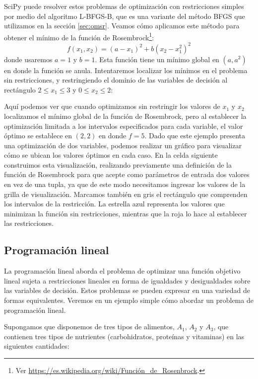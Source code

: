 SciPy puede resolver estos problemas de optimización con restricciones simples por medio del algoritmo L-BFGS-B, que es una variante del método BFGS que utilizamos en la sección \ref{sec:omsr}. Veamos cómo aplicamos este método para obtener el mínimo de la función de Rosembrock\footnote{Ver \url{https://es.wikipedia.org/wiki/Función_de_Rosenbrock}.}:
\[ f(x_1, x_2) = (a - x_1)^2 + b (x_2 - x_1^2)^2 \]
donde usaremos $a = 1$ y $b = 1$. Esta función tiene un mínimo global en $(a, a^2)$ en donde la función se anula. Intentaremos localizar los mínimos en el problema sin restricciones, y restringiendo el dominio de las variables de decisión al rectángulo $2 \leq x_1 \leq 3$ y $0 \leq x_2 \leq 2$:


Aquí podemos ver que cuando optimizamos sin restringir los valores de $x_1$ y $x_2$ localizamos el mínimo global de la función de Rosembrock, pero al establecer la optimización limitada a los intervalos especificados para cada variable, el valor óptimo se establece en $(2, 2)$ en donde $f = 5$. Dado que este ejemplo presenta una optimización de dos variables, podemos realizar un gráfico para visualizar cómo se ubican los valores óptimos en cada caso. En la celda siguiente construimos esta visualización, realizando previamente una definición de la función de Rosembrock para que acepte como parámetros de entrada dos valores en vez de una tupla, ya que de este modo necesitamos ingresar los valores de la grilla de visualización. Marcamos también en gris el rectángulo que comprenden los intervalos de la restricción. La estrella azul representa los valores que minimizan la función sin restricciones, mientras que la roja lo hace al establecer las restricciones.


\subsection{Programación lineal} \label{subsec:proglin}
La programación lineal aborda el problema de optimizar una función objetivo lineal sujeta a restricciones lineales en forma de igualdades y desigualdades sobre las variables de decisión. Estos problemas se pueden expresar en una variedad de formas equivalentes. Veremos en un ejemplo simple cómo abordar un problema de programación lineal.

Supongamos que disponemos de tres tipos de alimentos, $A_1$, $A_2$ y $A_3$, que contienen tres tipos de nutrientes (carbohidratos, proteínas y vitaminas) en las siguientes cantidades:

